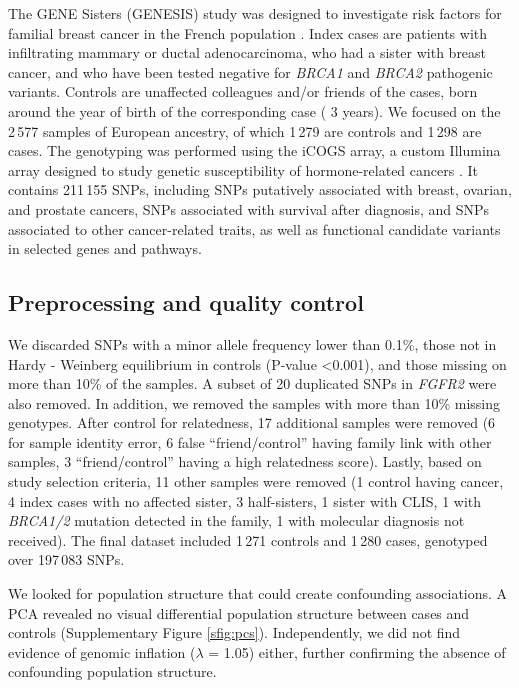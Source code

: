 \documentclass[twocolumn, 11pt, draft]{article}
\begin{document}
The GENE Sisters (GENESIS) study was designed to investigate risk factors for familial breast cancer in the French population \cite{sinilnikova_genesis:_2016}. Index cases are patients with infiltrating mammary or ductal adenocarcinoma, who had a sister with breast cancer, and who have been tested negative for \emph{BRCA1} and \emph{BRCA2} pathogenic variants. Controls are unaffected colleagues and/or friends of the cases, born around the year of birth of the corresponding case (\textpm{} 3 years). We focused on the 2\,577 samples of European ancestry, of which 1\,279 are controls and 1\,298 are cases. The genotyping was performed using the iCOGS array, a custom Illumina array designed to study genetic susceptibility of hormone-related cancers \cite{sakoda_turning_2013}. It contains 211\,155 SNPs, including SNPs putatively associated with breast, ovarian, and prostate cancers, SNPs associated with survival after diagnosis, and SNPs associated to other cancer-related traits, as well as functional candidate variants in selected genes and pathways.

\subsection{Preprocessing and quality control}

We discarded SNPs with a minor allele frequency lower than 0.1\%, those not in Hardy - Weinberg equilibrium in controls (P-value \textless 0.001), and those missing on more than 10\% of the samples. A subset of 20 duplicated SNPs in \emph{FGFR2} were also removed. In addition, we removed the samples with more than 10\% missing genotypes. After control for relatedness, 17 additional samples were removed (6 for sample identity error, 6 false ``friend/control'' having family link with other samples, 3 ``friend/control'' having a high relatedness score). Lastly, based on study selection criteria, 11 other samples were removed (1 control having cancer, 4 index cases with no affected sister, 3 half-sisters, 1 sister with CLIS, 1 with \emph{BRCA1/2} mutation detected in the family, 1 with molecular diagnosis not received). The final dataset included 1\,271 controls and 1\,280 cases, genotyped over 197\,083 SNPs. 

We looked for population structure that could create confounding associations. A PCA revealed no visual differential population structure between cases and controls (Supplementary Figure \ref{sfig:pcs}). Independently, we did not find evidence of genomic inflation (\(\lambda\) = 1.05) either, further confirming the absence of confounding population structure.
\end{document}
